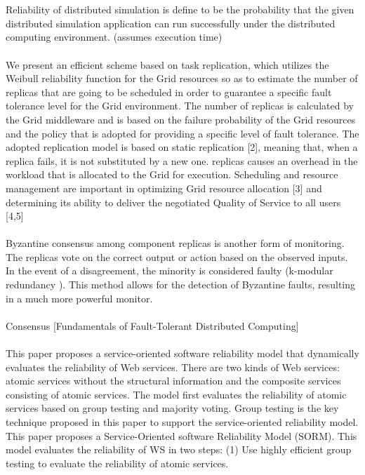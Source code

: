 \documentclass{cslthse-msc}
\begin{document}
\\\\
Reliability of distributed simulation is define to be the probability that the given distributed simulation application can run successfully under the distributed computing environment. (assumes execution time) \cite{relModelDistSimSystem}
\\\\
We present an efficient scheme based on task replication, which utilizes the Weibull reliability function for the Grid resources so as to estimate the number of replicas that are going to be scheduled in order to guarantee a specific fault tolerance level for the Grid environment. The number of replicas is calculated by the Grid middleware and is based on the failure probability of the Grid resources and the policy that is adopted for providing a specific level of fault tolerance. The adopted replication model is based on static replication [2], meaning that, when a replica fails, it is not substituted by a new one. replicas causes an overhead in the workload that is allocated to the Grid for execution. Scheduling and resource management are important in optimizing Grid resource allocation [3] and determining its ability to deliver the negotiated Quality of Service to all users [4,5] \cite{effTaskReplMobGrid}
\\\\
Byzantine consensus among component replicas is another form of monitoring. The replicas vote on the correct output or action based on the observed inputs. In the event of a disagreement, the minority is considered faulty (k-modular redundancy \cite{selfAdaptRel}). This method allows for the detection of Byzantine faults, resulting in a much more powerful monitor.  \cite{surveyFaultParallel}
\\\\
Consensus [Fundamentals of Fault-Tolerant Distributed Computing]
\\\\
This paper proposes a service-oriented software reliability model that dynamically evaluates the reliability of Web services. There are two kinds of Web services: atomic services without the structural information and the composite services consisting of atomic services. The model first evaluates the reliability of atomic services based on group testing and majority voting. Group testing is the key technique proposed in this paper to support the service-oriented reliability model.
This paper proposes a Service-Oriented software Reliability Model (SORM). This model evaluates the reliability of WS in two steps: (1) Use highly efficient group testing to evaluate the reliability of atomic services.
\end{document}
